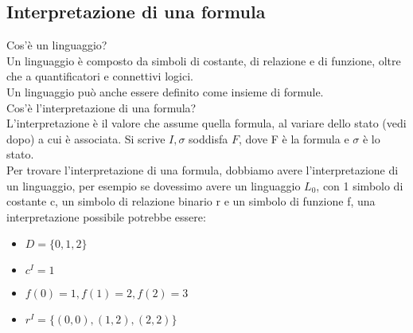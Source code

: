 \documentclass[11pt]{article}
\begin{document}
\subsection{Interpretazione di una formula}
Cos'è un linguaggio?\\
Un linguaggio è composto da simboli di costante, di relazione e di funzione, oltre che a quantificatori e connettivi logici.\\
Un linguaggio può anche essere definito come insieme di formule.\\
Cos'è l'interpretazione di una formula?\\
L'interpretazione è il valore che assume quella formula, al variare dello stato (vedi dopo) a cui è associata. Si scrive $I, \sigma$ soddisfa $F$, 
dove F è la formula e $\sigma$ è lo stato.\\
Per trovare l'interpretazione di una formula, dobbiamo avere l'interpretazione di un linguaggio, per esempio se dovessimo avere un 
linguaggio $L_{0}$, con 1 simbolo di costante c, un simbolo di relazione binario r e un simbolo di funzione f, 
una interpretazione possibile potrebbe essere:
\begin{itemize}
    \item $ D = \{0,1,2\}$
    \item $c^{I} = 1$
    \item $f(0) = 1, f(1)=2,f(2)=3$
    \item $r^{I} = \{(0,0),(1,2),(2,2)\}$
\end{itemize}
\end{document}
